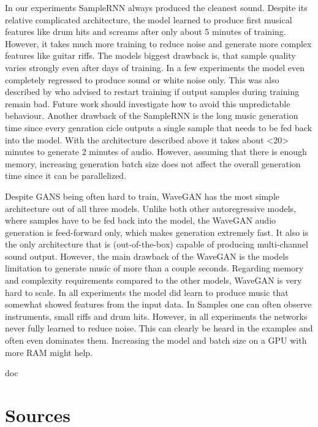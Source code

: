 \documentclass[12pt]{article}
\begin{document}
In our experiments SampleRNN always produced the cleanest sound.
Despite its relative complicated architecture, the model learned to produce first musical features like drum hits and screams after only about 5 minutes of training.
However, it takes much more training to reduce noise and generate more complex features like guitar riffs.
The models biggest drawback is, that sample quality varies strongly even after days of training.
In a few experiments the model even completely regressed to produce sound or white noise only.
This was also described by \cite{carr2018generating} who advised to restart training if output samples during training remain bad.
Future work should investigate how to avoid this unpredictable behaviour.
Another drawback of the SampleRNN is the long music generation time since every genration cicle outputs a single sample that needs to be fed back into the model.
With the architecture described above it takes about <20> minutes to generate 2 minutes of audio. %
However, assuming that there is enough memory, increasing generation batch size does not affect the overall generation time since it can be parallelized.


Despite GANS being often hard to train, WaveGAN has the most simple architecture out of all three models.
Unlike both other autoregressive models, where samples have to be fed back into the model, the WaveGAN audio generation is feed-forward only, which makes generation extremely fast.
It also is the only architecture that is (out-of-the-box) capable of producing multi-channel sound output.
However, the main drawback of the WaveGAN is the models limitation to generate music of more than a couple seconds.
Regarding memory and complexity requirements compared to the other models, WaveGAN is very hard to scale.
In all experiments the model did learn to produce music that somewhat showed features from the input data.
In Samples one can often observe instruments, small riffs and drum hits.
However, in all experiments the networks never fully learned to reduce noise.
This can clearly be heard in the examples and often even dominates them.
Increasing the model and batch size on a GPU with more RAM might help.

\newpage
\begin{btSect}{doc} %
\section*{Sources}
\btPrintCited
\end{btSect}
\end{document}
